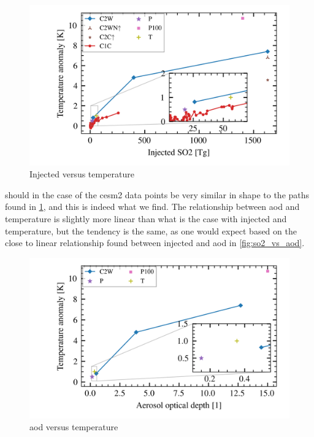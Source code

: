 \documentclass[twocol]{ametsocV5}
\newcommand{\iso}[1][i]{{#1}njected \ce{SO2}}
\begin{document}
\begin{figure}
  \begin{center}
    \includegraphics[width=0.95\linewidth]{figures/injection_vs_temperature.png}
  \end{center}
  \caption{Injected  versus temperature}%
  \label{fig:so2_vs_temp}
\end{figure}

 should in the case of the \acrshort{cesm2} data points be very
similar in shape to the paths found in \cref{fig:so2_vs_temp}, and this is indeed what
we find. The relationship between \acrshort{aod} and temperature is slightly more linear
than what is the case with \iso{} and temperature, but the tendency is the same, as one
would expect based on the close to linear relationship found between \iso{} and
\acrshort{aod} in \cref{fig:so2_vs_aod}.

\begin{figure}
  \begin{center}
    \includegraphics[width=0.95\linewidth]{figures/aod_vs_temperature.png}
  \end{center}
  \caption{\acrshort{aod} versus temperature}%
  \label{fig:aod_vs_temp}
\end{figure}
\end{document}
